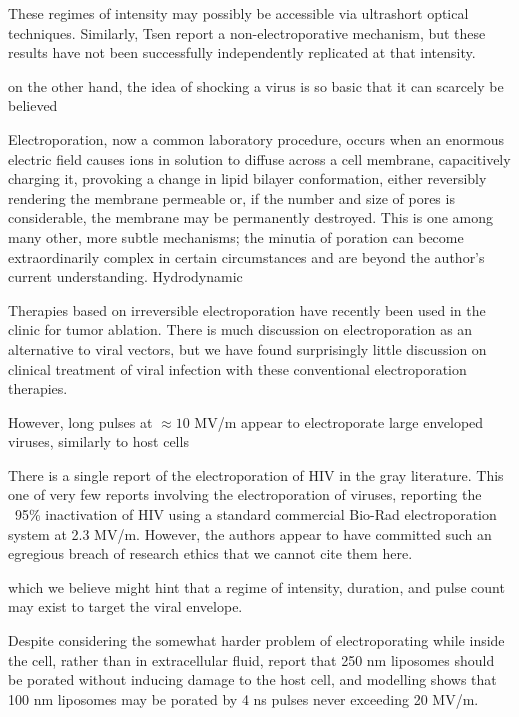 \documentclass[fleqn,10pt]{paper}
\begin{document}
These regimes of intensity may possibly be accessible via ultrashort optical techniques. Similarly, Tsen \cite{Studies2014} report a non-electroporative mechanism, but these results have not been successfully independently replicated at that intensity\cite{No2011}. 

on the other hand, the idea of shocking a virus is so basic that it can scarcely be believed 


Electroporation\cite{Electroporation1988}, now a common laboratory procedure, occurs when an enormous electric field causes ions in solution to diffuse across a cell membrane, capacitively charging it, provoking a change in lipid bilayer conformation\cite{Membrane2016}, either reversibly rendering the membrane permeable or, if the number and size of pores is considerable, the membrane may be permanently destroyed. This is one among many other, more subtle mechanisms; the minutia of poration can become extraordinarily complex in certain circumstances and are beyond the author's current understanding\cite{Theoretical2007}. Hydrodynamic

Therapies based on irreversible electroporation\cite{Nonthermal2013}\cite{Lipid2017} have recently been used in the clinic\cite{Irreversible2013} for tumor ablation. There is much discussion on electroporation as an alternative to viral vectors, but we have found surprisingly little discussion on clinical treatment of viral infection with these conventional electroporation therapies.

However, long pulses at $\approx10$ MV/m appear to electroporate large enveloped viruses, similarly to host cells\cite{AC2017}

There is a single report of the electroporation of HIV in the gray literature. This one of very few reports involving the electroporation of viruses, reporting the ~95\% inactivation of HIV using a standard commercial Bio-Rad electroporation system at 2.3 MV/m. However, the authors appear to have committed such an egregious breach of research ethics that we cannot cite them here.

 which we believe might hint that a regime of intensity, duration, and pulse count may exist to target the viral envelope. 
 
Despite considering the somewhat harder problem of electroporating while inside the cell, rather than in extracellular fluid, \cite{Electroporation2013} report that 250 nm liposomes should be porated without inducing damage to the host cell, and modelling shows that 100 nm liposomes may be porated by 4 ns pulses never exceeding 20 MV/m. 
\end{document}
